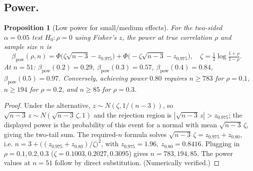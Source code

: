 \documentclass{amsart}
\newtheorem{proposition}{Proposition}
\theoremstyle{definition}
\begin{document}
\subsection*{Power.}
\begin{proposition}[Low power for small/medium effects]\label{prop:power}
For the two-sided $\alpha=0.05$ test $H_0:\rho=0$ using Fisher's $z$, the
power at true correlation $\rho$ and sample size $n$ is
\[
  \beta_{\text{pow}}(\rho,n)
   =\Phi\!\Big(\zeta\sqrt{n-3}-z_{0.975}\Big)
   +\Phi\!\Big(-\zeta\sqrt{n-3}-z_{0.975}\Big),
   \quad \zeta=\tfrac12\log\tfrac{1+\rho}{1-\rho}.
\]
At $n=51$: $\beta_{\text{pow}}(0.2)=0.29$, $\beta_{\text{pow}}(0.3)=0.57$,
$\beta_{\text{pow}}(0.4)=0.84$, $\beta_{\text{pow}}(0.5)=0.97$.
Conversely, achieving power $0.80$ requires $n\ge 783$ for $\rho=0.1$,
$n\ge 194$ for $\rho=0.2$, and $n\ge 85$ for $\rho=0.3$.
\end{proposition}

\begin{proof}
Under the alternative, $z\sim N(\zeta,1/(n-3))$, so $\sqrt{n-3}\,z\sim
N(\sqrt{n-3}\,\zeta,1)$ and the rejection region is
$|\sqrt{n-3}\,z|>z_{0.975}$; the displayed power is the probability of this
event for a normal with mean $\sqrt{n-3}\,\zeta$, giving the two-tail sum.
The required-$n$ formula solves
$\sqrt{n-3}\,\zeta=z_{0.975}+z_{0.80}$, i.e.
$n=3+\big((z_{0.975}+z_{0.80})/\zeta\big)^2$, with
$z_{0.975}=1.96,\ z_{0.80}=0.8416$. Plugging in $\rho=0.1,0.2,0.3$
($\zeta=0.1003,0.2027,0.3095$) gives $n=783,194,85$. The power values at
$n=51$ follow by direct substitution. (Numerically verified.)
\end{proof}
\end{document}
